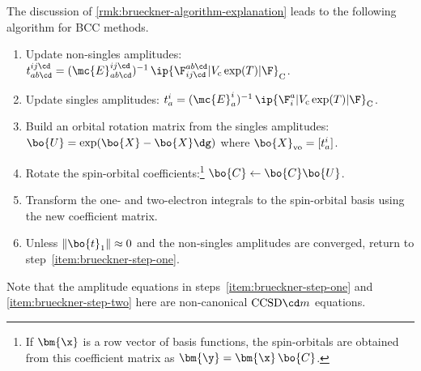 \begin{rmk}
The discussion of \cref{rmk:brueckner-algorithm-explanation} leads to the following algorithm for BCC methods.
\begin{enumerate}
\item
\label{item:brueckner-step-one}
Update non-singles amplitudes:
$
  t_{ab\cd}^{ij\cd}
=
  (\mc{E}_{ab\cd}^{ij\cd})^{-1}\,
  \ip{\F_{ij\cd}^{ab\cd}|
    V_{\text{c}}\,
    \text{exp}(T)
  |\F}_{\text{C}}
$.

\item
\label{item:brueckner-step-two}
Update singles amplitudes:
$
  t_a^i
=
  (\mc{E}_a^i)^{-1}\,
  \ip{\F_i^a|
    V_{\text{c}}\,
    \text{exp}(T)
  |\F}_{\text{C}}
$.

\item
Build an orbital rotation matrix from the singles amplitudes:
$
  \bo{U}
=
  \text{exp}(\bo{X} - \bo{X}\dg)
$
where
$
  \bo{X}_{\text{vo}}
=
  [t_a^i]
$.

\item
Rotate the spin-orbital coefficients:\footnote{
  If $\bm{\x}$ is a row vector of basis functions, the spin-orbitals are obtained from this coefficient matrix as
  $\bm{\y}=\bm{\x}\,\bo{C}$.
}
$
  \bo{C}
\leftarrow
  \bo{C}\bo{U}
$.

\item
Transform the one- and two-electron integrals to the spin-orbital basis using the new coefficient matrix.

\item
Unless $\|\bo{t}_1\|\approx0$ and the non-singles amplitudes are converged, return to step~\ref{item:brueckner-step-one}.
\end{enumerate}
Note that the amplitude equations in steps~\ref{item:brueckner-step-one} and \ref{item:brueckner-step-two} here are non-canonical $\text{CCSD}{\cd}m$ equations.
\end{rmk}


